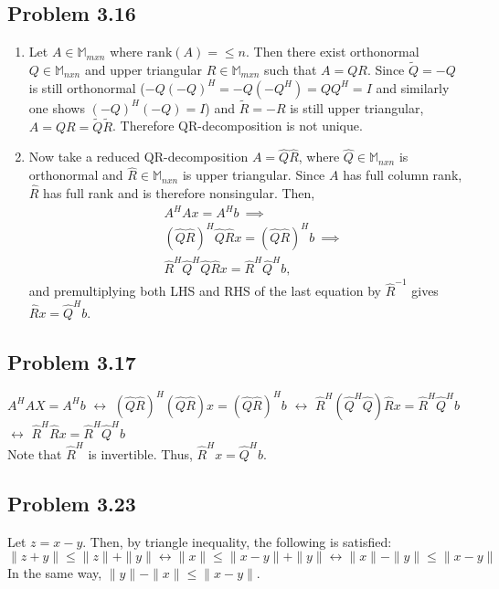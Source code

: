 \documentclass[letterpaper,12pt]{article}
\theoremstyle{definition}
\begin{document}
\begin{spacing}{1.3}{}
\subsection*{Problem 3.16}
\begin{enumerate}
  \item 
  	Let $A\in\mathbb M_{mxn}$ where $\text{rank}(A)=\leq n$.
	Then there exist orthonormal $Q\in\mathbb M_{nxn}$ and
	upper triangular $R\in\mathbb M_{mxn}$ such that $A=QR$.
	Since $\tilde{Q}=-Q$ is still orthonormal ($-Q(-Q)^H=-Q(-Q^H)=QQ^H=I$
	and similarly one shows $(-Q)^H(-Q)=I$)
	and $\tilde{R}=-R$ is still upper triangular,
	$A=QR=\tilde{Q}\tilde{R}$.
	Therefore QR-decomposition is not unique. \\
	\item
	Now take a reduced QR-decomposition $A=\hat{Q}\hat{R}$,
	where $\hat{Q}\in\mathbb M_{nxn}$ is orthonormal and $\hat{R}\in\mathbb M_{nxn}$ is upper triangular.
	Since $A$ has full column rank, $\hat{R}$ has full rank and is therefore nonsingular.
	Then,
	\begin{align*}
	&A^HAx=A^Hb\ \implies\\
	&(\hat{Q}\hat{R})^H\hat{Q}\hat{R}x = (\hat{Q}\hat{R})^Hb\ \implies\\
	&\hat{R}^H\hat{Q}^H\hat{Q}\hat{R}x = \hat{R}^H\hat{Q}^Hb,
	\end{align*}
	and premultiplying both LHS and RHS of the last equation by $\hat{R}^{-1}$ gives
	$\hat{R}x = \hat{Q}^Hb$. \
\end{enumerate}
	
\subsection*{Problem 3.17}

$A^{H}AX = A^{H}b$ $\leftrightarrow$ $(\hat{Q} \hat{R})^{H} (\hat{Q} \hat{R}) x = (\hat{Q} \hat{R})^{H} b $ $\leftrightarrow$ $\hat{R}^{H} (\hat{Q}^{H} \hat{Q}) \hat{R} x = \hat{R}^{H} \hat{Q}^{H} b$ $\leftrightarrow$ $\hat{R}^{H} \hat{R} x = \hat{R}^{H} \hat{Q}^{H}b $ \\
	Note that $\hat{R}^{H}$ is invertible. Thus, $\hat{R}^{H} x = \hat{Q}^{H} b$.
	
	
\subsection*{Problem 3.23}

 Let $z = x-y$. Then, by triangle inequality, the following is satisfied: \\
	\[\|z+y\| \leq \|z\| + \|y\| \leftrightarrow \|x\| \leq \|x-y\| + \|y\| \leftrightarrow \|x\| - \|y\| \leq \|x-y\| \]
	In the same way, $\|y\| - \|x\| \leq \|x-y\|$. 


\end{spacing}
\end{document}
